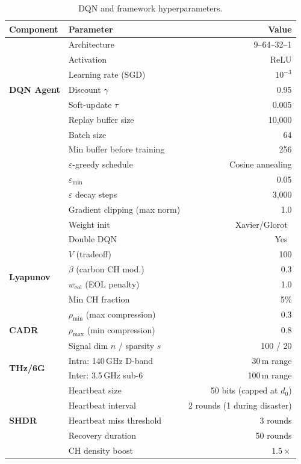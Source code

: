 \documentclass[12pt, onecolumn, journal]{IEEEtran}
\begin{document}
\begin{table}[!t]
\centering
\caption{DQN and framework hyperparameters.}
\label{tab:hyperparams}
\begin{tabular}{llr}
\toprule
Component & Parameter & Value \\
\midrule
\multirow{7}{*}{\textbf{DQN Agent}}
    & Architecture & 9--64--32--1 \\
    & Activation & ReLU \\
    & Learning rate (SGD) & $10^{-3}$ \\
    & Discount $\gamma$ & 0.95 \\
    & Soft-update $\tau$ & 0.005 \\
    & Replay buffer size & 10{,}000 \\
    & Batch size & 64 \\
    & Min buffer before training & 256 \\
    & $\varepsilon$-greedy schedule & Cosine annealing \\
    & $\varepsilon_{\min}$ & 0.05 \\
    & $\varepsilon$ decay steps & 3{,}000 \\
    & Gradient clipping (max norm) & 1.0 \\
    & Weight init & Xavier/Glorot~\cite{glorot2010xavier} \\
    & Double DQN & Yes~\cite{vanhasselt2016ddqn} \\
\midrule
\multirow{4}{*}{\textbf{Lyapunov}}
    & $V$ (tradeoff) & 100 \\
    & $\beta$ (carbon CH mod.) & 0.3 \\
    & $w_{\text{eol}}$ (EOL penalty) & 1.0 \\
    & Min CH fraction & 5\% \\
\midrule
\multirow{3}{*}{\textbf{CADR}}
    & $\rho_{\min}$ (max compression) & 0.3 \\
    & $\rho_{\max}$ (min compression) & 0.8 \\
    & Signal dim $n$ / sparsity $s$ & 100 / 20 \\
\midrule
\multirow{2}{*}{\textbf{THz/6G}}
    & Intra: 140\,GHz D-band & 30\,m range \\
    & Inter: 3.5\,GHz sub-6 & 100\,m range \\
\midrule
\multirow{5}{*}{\textbf{SHDR}}
    & Heartbeat size & 50 bits (capped at $d_0$) \\
    & Heartbeat interval & 2 rounds (1 during disaster) \\
    & Heartbeat miss threshold & 3 rounds \\
    & Recovery duration & 50 rounds \\
    & CH density boost & $1.5\times$ \\
\bottomrule
\end{tabular}
\end{table}
\end{document}
